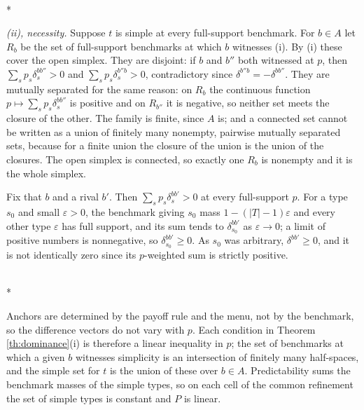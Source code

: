 \documentclass[12pt]{article}
\makeatletter
\theoremstyle{definition}
\renewenvironment{proof}[1][\proofname]{\par
  \pushQED{\qed}%
  \normalfont \topsep6\p@\@plus6\p@\relax
  \trivlist
  \item[\hskip\labelsep\itshape #1\@addpunct{.}]\mbox{}\\*
  \ignorespaces
}{%
  \popQED\endtrivlist\@endpefalse
}
\makeatother
\begin{document}
\begin{proof}[Proof of Theorem \ref{th:dominance}]
\emph{(ii), necessity.} Suppose $t$ is simple at every full-support benchmark. For $b \in A$ let $R_b$ be the set of full-support benchmarks at which $b$ witnesses (i). By (i) these cover the open simplex. They are disjoint: if $b$ and $b''$ both witnessed at $p$, then $\sum_s p_s \delta^{bb''}_s > 0$ and $\sum_s p_s \delta^{b''b}_s > 0$, contradictory since $\delta^{b''b} = -\delta^{bb''}$. They are mutually separated for the same reason: on $R_b$ the continuous function $p \mapsto \sum_s p_s \delta^{bb''}_s$ is positive and on $R_{b''}$ it is negative, so neither set meets the closure of the other. The family is finite, since $A$ is; and a connected set cannot be written as a union of finitely many nonempty, pairwise mutually separated sets, because for a finite union the closure of the union is the union of the closures. The open simplex is connected, so exactly one $R_b$ is nonempty and it is the whole simplex.

Fix that $b$ and a rival $b'$. Then $\sum_s p_s \delta^{bb'}_s > 0$ at every full-support $p$. For a type $s_0$ and small $\varepsilon > 0$, the benchmark giving $s_0$ mass $1 - (|T|-1)\varepsilon$ and every other type $\varepsilon$ has full support, and its sum tends to $\delta^{bb'}_{s_0}$ as $\varepsilon \to 0$; a limit of positive numbers is nonnegative, so $\delta^{bb'}_{s_0} \ge 0$. As $s_0$ was arbitrary, $\delta^{bb'} \ge 0$, and it is not identically zero since its $p$-weighted sum is strictly positive.
\end{proof}

\begin{proof}[Proof of Corollary \ref{cor:pwlinear}]
Anchors are determined by the payoff rule and the menu, not by the benchmark, so the difference vectors do not vary with $p$. Each condition in Theorem \ref{th:dominance}(i) is therefore a linear inequality in $p$; the set of benchmarks at which a given $b$ witnesses simplicity is an intersection of finitely many half-spaces, and the simple set for $t$ is the union of these over $b \in A$. Predictability sums the benchmark masses of the simple types, so on each cell of the common refinement the set of simple types is constant and $P$ is linear.
\end{proof}
\end{document}
